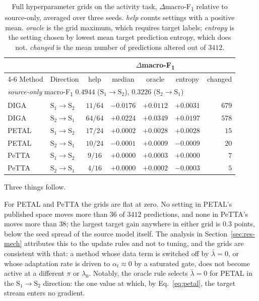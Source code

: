 \documentclass[a4paper,fleqn]{cas-dc}
\newcommand{\macf}{macro-F\textsubscript{1}}
\begin{document}
\begin{table}[t]
\centering
\caption{Full hyperparameter grids on the activity task, $\Delta$\macf{} relative to
source-only, averaged over three seeds. \emph{help} counts settings with a positive mean.
\emph{oracle} is the grid maximum, which requires target labels; \emph{entropy} is the
setting chosen by lowest mean target prediction entropy, which does not. \emph{changed} is
the mean number of predictions altered out of $3412$.}
\label{tab:hgrid}
\small
\begin{tabular}{llccccr}
\toprule
 & & & \multicolumn{3}{c}{$\Delta$\macf} & \\
\cmidrule(lr){4-6}
Method & Direction & help & median & oracle & entropy & changed \\
\midrule
\multicolumn{7}{l}{\emph{source-only} \macf{} $0.4944$ ($\text{S}_1\!\to\!\text{S}_2$), $0.3226$ ($\text{S}_2\!\to\!\text{S}_1$)} \\
\addlinespace[2pt]
DIGA  & $\text{S}_1\!\to\!\text{S}_2$ & $11/64$ & $-0.0176$ & $+0.0112$ & $+0.0031$ & $679$ \\
DIGA  & $\text{S}_2\!\to\!\text{S}_1$ & $64/64$ & $+0.0224$ & $+0.0349$ & $+0.0197$ & $578$ \\
PETAL & $\text{S}_1\!\to\!\text{S}_2$ & $17/24$ & $+0.0002$ & $+0.0028$ & $+0.0028$ & $15$ \\
PETAL & $\text{S}_2\!\to\!\text{S}_1$ & $10/24$ & $-0.0001$ & $+0.0009$ & $-0.0009$ & $20$ \\
PeTTA & $\text{S}_1\!\to\!\text{S}_2$ & $9/16$  & $+0.0000$ & $+0.0003$ & $+0.0000$ & $7$ \\
PeTTA & $\text{S}_2\!\to\!\text{S}_1$ & $4/16$  & $+0.0000$ & $+0.0002$ & $-0.0003$ & $5$ \\
\bottomrule
\end{tabular}
\end{table}

Three things follow.

For PETAL and PeTTA the grids are flat at zero. No setting in PETAL's published space
moves more than $36$ of $3412$ predictions, and none in PeTTA's moves more than $38$; the
largest target gain anywhere in either grid is $0.3$ points, below the seed spread of the
source model itself. The analysis in Section~\ref{sec:res-mech} attributes this to the
update rules and not to tuning, and the grids are consistent with that: a method whose
data term is switched off by $\bar\lambda=0$, or whose adaptation rate is driven to
$\alpha_t\approx0$ by a saturated gate, does not become active at a different $\pi$ or
$\lambda_0$. Notably, the oracle rule selects $\bar\lambda=0$ for PETAL in the
$\text{S}_1\!\to\!\text{S}_2$ direction: the one value at which, by
Eq.~\ref{eq:petal}, the target stream enters no gradient.
\end{document}
